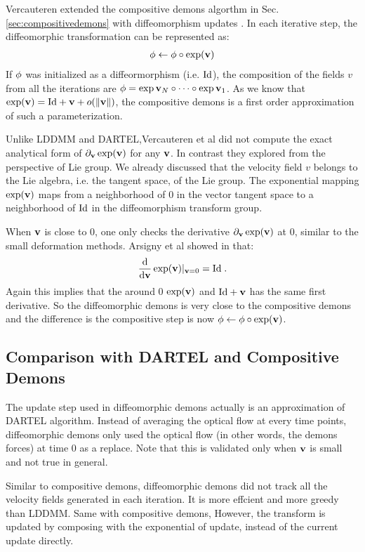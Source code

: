 \documentclass[letterpaper,12pt]{article}
\begin{document}
Vercauteren extended the compositive demons algorthm in Sec. \ref{sec:compositivedemons} with diffeomorphism updates \cite{Vercauteren2009}. In each iterative step, the diffeomorphic transformation can be represented as:
\begin{align}
\phi \leftarrow \phi \circ \exp(\mathbf{v})
\end{align}
If $\phi$ was initialized as a diffeormorphism (i.e. $\text{Id}$), the composition of the fields $v$ from all the iterations are $\phi = \exp{\mathbf{v}_N} \circ \cdots \circ \exp{\mathbf{v}_1}$. As we know that $\exp(\mathbf{v}) = \text{Id} + \mathbf{v} + o(\|\mathbf{v}\|)$, the compositive demons is a first order approximation of such a parameterization.

Unlike LDDMM and DARTEL,Vercauteren et al did not compute the exact analytical form of $\partial_{\mathbf{v}} \exp(\mathbf{v})$ for any $\mathbf{v}$. In contrast they explored from the perspective of Lie group. We already discussed that the velocity field $v$ belongs to the Lie algebra, i.e. the tangent space, of the Lie group. The exponential mapping $\exp(\mathbf{v})$ maps from a neighborhood of $0$ in the vector tangent space to a neighborhood of $\text{Id}$ in the diffeomorphism transform group. 

When $\mathbf{v}$ is close to $0$, one only checks the derivative $\partial_{\mathbf{v}}\exp(\mathbf{v})$ at $0$, similar to the small deformation methods. Arsigny et al showed in \cite{Arsigny2006} that:
\begin{align}
\frac{\text{d}}{\text{d}\mathbf{v}} \exp(\mathbf{v}) \rvert_{\mathbf{v}=0} = \text{Id} \; .
\end{align}
Again this implies that the around 0 $\exp(\mathbf{v})$ and $\text{Id}+\mathbf{v}$ has the same first derivative. So the diffeomorphic demons is very close to the compositive demons and the difference is the compositive step is now $\phi \leftarrow \phi \circ \exp(\mathbf{v})$.

\subsection{Comparison with DARTEL and Compositive Demons}

The update step used in diffeomorphic demons actually is an approximation of DARTEL algorithm. Instead of averaging the optical flow at every time points, diffeomorphic demons only used the optical flow (in other words, the demons forces) at time $0$ as a replace. Note that this is validated only when $\mathbf{v}$ is small and not true in general. 

Similar to compositive demons, diffeomorphic demons did not track all the velocity fields generated in each iteration. It is more effcient and more greedy than LDDMM. Same with compositive demons, 
However, the transform is updated by composing with the exponential of update, instead of the current update directly. 
\end{document}
